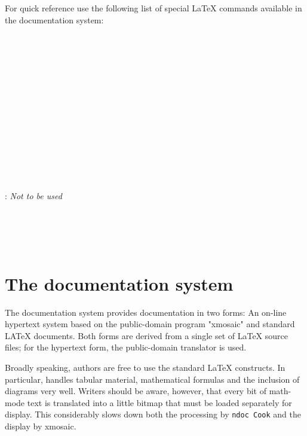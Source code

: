         For quick reference use the following list of special LaTeX commands
available in the \NEWSTAR documentation system: 
\\ \\ 
 \\ 
 \\ 
 \\ 
 \\ 
 \\ 
 \\ 
 \\ 
 \\ 
 \\ 
 \\ 
 \\ 
 \\ 
 \\ 
: {\em Not to be used} \\ 
 \\ 
 \\ 
 \\ 
 \\ 


\section{ The \NEWSTAR documentation system} 

        The \NEWSTAR documentation system provides documentation in two forms:
An on-line hypertext system based on the public-domain program "xmosaic" and
standard LATeX documents. Both forms are derived from a single set of LaTeX
source files; for the hypertext form, the public-domain translator \ltoh is
used. 

        Broadly speaking, authors are free to use the standard LaTeX
constructs. In particular, \ltoh handles tabular material, mathematical
formulas and the inclusion of diagrams very well. Writers should be aware,
however, that every bit of math-mode text is translated into a little bitmap
that must be loaded separately for display. This considerably slows down both
the processing by \verb/ndoc Cook/ and the display by xmosaic. 


